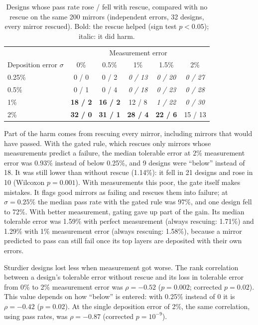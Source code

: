\begin{table}[t]
\centering
\caption{Designs whose pass rate rose / fell with rescue, compared with no rescue on the same 200 mirrors (independent errors, 32 designs, every mirror rescued). Bold: the rescue helped (sign test $p < 0.05$); italic: it did harm.}
\label{tab:thresh}
\footnotesize
\begin{tabular}{lccccc}
\toprule
 & \multicolumn{5}{c}{Measurement error} \\
Deposition error $\sigma$ & 0\% & 0.5\% & 1\% & 1.5\% & 2\% \\
\midrule
0.25\% & 0 / 0 & 0 / 2 & \emph{0 / 13} & \emph{0 / 20} & \emph{0 / 27} \\
0.5\% & 0 / 1 & 0 / 4 & \emph{0 / 18} & \emph{0 / 23} & \emph{0 / 28} \\
1\% & \textbf{18 / 2} & \textbf{16 / 2} & 12 / 8 & \emph{1 / 22} & \emph{0 / 30} \\
2\% & \textbf{32 / 0} & \textbf{31 / 1} & \textbf{28 / 4} & \textbf{22 / 6} & 15 / 13 \\
\bottomrule
\end{tabular}
\end{table}

Part of the harm comes from rescuing every mirror, including mirrors that would have passed. With the gated rule, which rescues only mirrors whose measurements predict a failure, the median tolerable error at 2\% measurement error was 0.93\% instead of below 0.25\%, and 9 designs were ``below'' instead of 18. It was still lower than without rescue (1.14\%): it fell in 21 designs and rose in 10 (Wilcoxon $p = 0.001$). With measurements this poor, the gate itself makes mistakes. It flags good mirrors as failing and rescues them into failure; at $\sigma = 0.25\%$ the median pass rate with the gated rule was 97\%, and one design fell to 72\%. With better measurement, gating gave up part of the gain. Its median tolerable error was 1.59\% with perfect measurement (always rescuing: 1.71\%) and 1.29\% with 1\% measurement error (always rescuing: 1.58\%), because a mirror predicted to pass can still fail once its top layers are deposited with their own errors.

Sturdier designs lost less when measurement got worse. The rank correlation between a design's tolerable error without rescue and its loss in tolerable error from 0\% to 2\% measurement error was $\rho = -0.52$ ($p = 0.002$; corrected $p = 0.02$). This value depends on how ``below'' is entered: with 0.25\% instead of 0 it is $\rho = -0.42$ ($p = 0.02$). At the single deposition error of 2\%, the same correlation, using pass rates, was $\rho = -0.87$ (corrected $p = 10^{-9}$).

